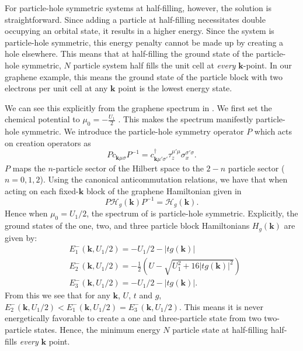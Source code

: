\documentclass[prb,aps,amssymb,twocolumn,notitlepage]{revtex4-2}
\begin{document}
For particle-hole symmetric systems at half-filling, however, the solution is straightforward. 
Since adding a particle at half-filling necessitates double occupying an orbital state, it results in a higher energy. 
Since the system is particle-hole symmetric, this energy penalty cannot be made up by creating a hole elsewhere. 
This means that at half-filling the ground state of the particle-hole symmetric, $N$ particle system half fills the unit cell at \textit{every} $\mathbf{k}$-point. 
In our graphene example, this means the ground state of the particle block with two electrons per unit cell at any $\mathbf{k}$ point is the lowest energy state. 


We can see this explicitly from the graphene spectrum in . 
We first set the chemical potential to $\mu_0=-\tfrac{U_1}{2}$ .
This makes the spectrum manifestly particle-hole symmetric. 
We introduce the particle-hole symmetry operator $P$ which acts on creation operators as
\begin{equation}\label{eq:grapheneph}
Pc_{\mathbf{k}\mu\sigma}P^{-1} = c^\dag_{\mathbf{k}\mu'\sigma'}\tau_z^{\mu'\mu}\sigma_x^{\sigma'\sigma}.
\end{equation}
$P$ maps the $n$-particle sector of the Hilbert space to the $2-n$ particle sector ($n=0,1,2$). 
Using the canonical anticommutation relations, we have that when acting on each fixed-$\mathbf{k}$ block of the graphene Hamiltonian given in 
\begin{equation}
P\mathcal{H}_{g}(\mathbf{k})P^{-1} = \mathcal{H}_{g}(\mathbf{k}).
\end{equation} 
Hence when $\mu_0=U_1/2$, the spectrum of  is particle-hole symmetric. 
Explicitly, the ground states of the one, two, and three particle block Hamiltonians $H_{g}(\mathbf{k})$ are given by:
\begin{align}
    &E^-_{1}(\mathbf{k},U_1/2)=-U_1/2-|tg(\mathbf{k})|\\
    \label{eq:E2graphenewithmu}
    &E^-_{2}(\mathbf{k},U_1/2)=-\frac{1}{2}\left(U-\sqrt{U^2_{1}+16|tg(\mathbf{k})|^2}\right)\\
    &E^-_{3}(\mathbf{k},U_1/2)=-U_1/2-|tg(\mathbf{k})|\text{} .
\end{align}
From this we see that for any $\mathbf{k}$, $U$, $t$ and $g$, $E^-_{2}(\mathbf{k},U_1/2)<E^-_{1}(\mathbf{k},U_1/2)=E^-_{3}(\mathbf{k},U_1/2)$. 
This means it is never energetically favorable to create a one and three-particle state from two two-particle states. 
Hence, the minimum energy $N$ particle state at half-filling half-fills \textit{every} $\mathbf{k}$ point. 
\end{document}
